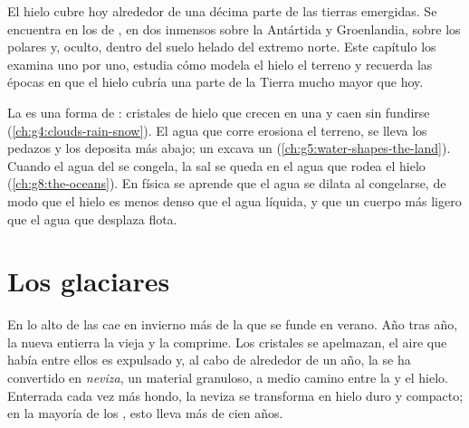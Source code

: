 El hielo cubre hoy alrededor de una décima parte de las tierras emergidas.
Se encuentra en los  de , en dos  inmensos sobre la
Antártida y Groenlandia, sobre los  polares y, oculto, dentro del
suelo helado del extremo norte. Este capítulo los examina uno por uno,
estudia cómo modela el hielo el terreno y recuerda las épocas en que el
hielo cubría una parte de la Tierra mucho mayor que hoy.

\begin{recall}
La  es una forma de : cristales de hielo que crecen en
una  y caen sin fundirse (\cref{ch:g4:clouds-rain-snow}). El agua que
corre erosiona el terreno, se lleva los pedazos y los deposita más abajo;
un  excava un  (\cref{ch:g5:water-shapes-the-land}). Cuando el agua
del  se congela, la sal se queda en el agua que rodea el hielo
(\cref{ch:g8:the-oceans}). En física se aprende que el agua se dilata al
congelarse, de modo que el hielo es menos denso que el agua líquida, y que
un cuerpo más ligero que el agua que desplaza flota.
\end{recall}

\section{Los glaciares}

En lo alto de las  cae en invierno más  de la que se funde en
verano. Año tras año, la  nueva entierra la  vieja y la
comprime. Los cristales se apelmazan, el aire que había entre ellos es
expulsado y, al cabo de alrededor de un año, la  se ha convertido en
\emph{neviza}, un material granuloso, a medio camino entre la  y el
hielo. Enterrada cada vez más hondo, la neviza se transforma en hielo
duro y compacto; en la mayoría de los , esto lleva más de cien
años.

